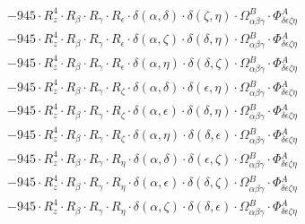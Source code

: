 \documentclass{article}
\begin{document}
\begin{equation}
\begin{array}{c}
 \\[0.2em] 		 - 945 \cdot R_{z}^{4} \cdot R_{\beta{}} \cdot R_{\gamma{}} \cdot R_{\epsilon{}} \cdot \delta{}\left(\alpha{}, \delta{}\right) \cdot \delta{}\left(\zeta{}, \eta{}\right) \cdot \Omega{}^{B}_{\alpha{}\beta{}\gamma{}} \cdot \Phi{}^{A}_{\delta{}\epsilon{}\zeta{}\eta{}} 
 \\[0.2em] 		 - 945 \cdot R_{z}^{4} \cdot R_{\beta{}} \cdot R_{\gamma{}} \cdot R_{\epsilon{}} \cdot \delta{}\left(\alpha{}, \zeta{}\right) \cdot \delta{}\left(\delta{}, \eta{}\right) \cdot \Omega{}^{B}_{\alpha{}\beta{}\gamma{}} \cdot \Phi{}^{A}_{\delta{}\epsilon{}\zeta{}\eta{}} 
 \\[0.2em] 		 - 945 \cdot R_{z}^{4} \cdot R_{\beta{}} \cdot R_{\gamma{}} \cdot R_{\epsilon{}} \cdot \delta{}\left(\alpha{}, \eta{}\right) \cdot \delta{}\left(\delta{}, \zeta{}\right) \cdot \Omega{}^{B}_{\alpha{}\beta{}\gamma{}} \cdot \Phi{}^{A}_{\delta{}\epsilon{}\zeta{}\eta{}} 
 \\[0.2em] 		 - 945 \cdot R_{z}^{4} \cdot R_{\beta{}} \cdot R_{\gamma{}} \cdot R_{\zeta{}} \cdot \delta{}\left(\alpha{}, \delta{}\right) \cdot \delta{}\left(\epsilon{}, \eta{}\right) \cdot \Omega{}^{B}_{\alpha{}\beta{}\gamma{}} \cdot \Phi{}^{A}_{\delta{}\epsilon{}\zeta{}\eta{}} 
 \\[0.2em] 		 - 945 \cdot R_{z}^{4} \cdot R_{\beta{}} \cdot R_{\gamma{}} \cdot R_{\zeta{}} \cdot \delta{}\left(\alpha{}, \epsilon{}\right) \cdot \delta{}\left(\delta{}, \eta{}\right) \cdot \Omega{}^{B}_{\alpha{}\beta{}\gamma{}} \cdot \Phi{}^{A}_{\delta{}\epsilon{}\zeta{}\eta{}} 
 \\[0.2em] 		 - 945 \cdot R_{z}^{4} \cdot R_{\beta{}} \cdot R_{\gamma{}} \cdot R_{\zeta{}} \cdot \delta{}\left(\alpha{}, \eta{}\right) \cdot \delta{}\left(\delta{}, \epsilon{}\right) \cdot \Omega{}^{B}_{\alpha{}\beta{}\gamma{}} \cdot \Phi{}^{A}_{\delta{}\epsilon{}\zeta{}\eta{}} 
 \\[0.2em] 		 - 945 \cdot R_{z}^{4} \cdot R_{\beta{}} \cdot R_{\gamma{}} \cdot R_{\eta{}} \cdot \delta{}\left(\alpha{}, \delta{}\right) \cdot \delta{}\left(\epsilon{}, \zeta{}\right) \cdot \Omega{}^{B}_{\alpha{}\beta{}\gamma{}} \cdot \Phi{}^{A}_{\delta{}\epsilon{}\zeta{}\eta{}} 
 \\[0.2em] 		 - 945 \cdot R_{z}^{4} \cdot R_{\beta{}} \cdot R_{\gamma{}} \cdot R_{\eta{}} \cdot \delta{}\left(\alpha{}, \epsilon{}\right) \cdot \delta{}\left(\delta{}, \zeta{}\right) \cdot \Omega{}^{B}_{\alpha{}\beta{}\gamma{}} \cdot \Phi{}^{A}_{\delta{}\epsilon{}\zeta{}\eta{}} 
 \\[0.2em] 		 - 945 \cdot R_{z}^{4} \cdot R_{\beta{}} \cdot R_{\gamma{}} \cdot R_{\eta{}} \cdot \delta{}\left(\alpha{}, \zeta{}\right) \cdot \delta{}\left(\delta{}, \epsilon{}\right) \cdot \Omega{}^{B}_{\alpha{}\beta{}\gamma{}} \cdot \Phi{}^{A}_{\delta{}\epsilon{}\zeta{}\eta{}} 

\end{array}
\end{equation}
\end{document}
